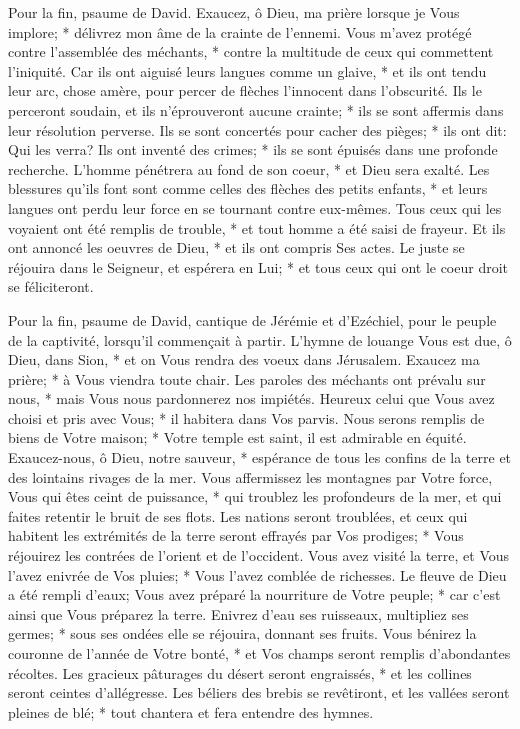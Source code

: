 Pour la fin, psaume de David.
Exaucez, ô Dieu, ma prière lorsque je Vous implore; * délivrez mon âme de la crainte de l'ennemi.
Vous m'avez protégé contre l'assemblée des méchants, * contre la multitude de ceux qui commettent l'iniquité.
Car ils ont aiguisé leurs langues comme un glaive, * et ils ont tendu leur arc, chose amère,
pour percer de flèches l'innocent dans l'obscurité.
Ils le perceront soudain, et ils n'éprouveront aucune crainte; * ils se sont affermis dans leur résolution perverse. Ils se sont concertés pour cacher des pièges; * ils ont dit: Qui les verra?
Ils ont inventé des crimes; * ils se sont épuisés dans une profonde recherche. L'homme pénétrera au fond de son coeur, *
et Dieu sera exalté. Les blessures qu'ils font sont comme celles des flèches des petits enfants, *
et leurs langues ont perdu leur force en se tournant contre eux-mêmes. Tous ceux qui les voyaient ont été remplis de trouble, *
et tout homme a été saisi de frayeur. Et ils ont annoncé les oeuvres de Dieu, * et ils ont compris Ses actes.
Le juste se réjouira dans le Seigneur, et espérera en Lui; * et tous ceux qui ont le coeur droit se féliciteront.

Pour la fin, psaume de David, cantique de Jérémie et d'Ezéchiel, pour le peuple de la captivité, lorsqu'il commençait à partir.
L'hymne de louange Vous est due, ô Dieu, dans Sion, * et on Vous rendra des voeux dans Jérusalem.
Exaucez ma prière; * à Vous viendra toute chair.
Les paroles des méchants ont prévalu sur nous, * mais Vous nous pardonnerez nos impiétés.
Heureux celui que Vous avez choisi et pris avec Vous; * il habitera dans Vos parvis. Nous serons remplis de biens de Votre maison; * Votre temple est saint,
il est admirable en équité. Exaucez-nous, ô Dieu, notre sauveur, * espérance de tous les confins de la terre et des lointains rivages de la mer.
Vous affermissez les montagnes par Votre force, Vous qui êtes ceint de puissance, *
qui troublez les profondeurs de la mer, et qui faites retentir le bruit de ses flots. Les nations seront troublées,
et ceux qui habitent les extrémités de la terre seront effrayés par Vos prodiges; * Vous réjouirez les contrées de l'orient et de l'occident.
Vous avez visité la terre, et Vous l'avez enivrée de Vos pluies; * Vous l'avez comblée de richesses. Le fleuve de Dieu a été rempli d'eaux; Vous avez préparé la nourriture de Votre peuple; * car c'est ainsi que Vous préparez la terre.
Enivrez d'eau ses ruisseaux, multipliez ses germes; * sous ses ondées elle se réjouira, donnant ses fruits.
Vous bénirez la couronne de l'année de Votre bonté, * et Vos champs seront remplis d'abondantes récoltes.
Les gracieux pâturages du désert seront engraissés, * et les collines seront ceintes d'allégresse.
Les béliers des brebis se revêtiront, et les vallées seront pleines de blé; * tout chantera et fera entendre des hymnes.

